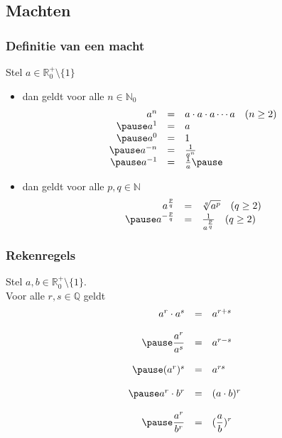 \subsection{Machten}
\begin{frame}
\frametitle{Definitie van een macht}
\pause
\begin{definitie}
Stel $a \in \mathbb{R}_0^+ \setminus \{1\}$
\begin{itemize}
\item<+-> dan geldt voor alle $n \in \mathbb{N}_0$
      \pause
      \[\begin{array}{rcl}
        a^n & = & a\cdot a\cdot a \cdots a ~~~(n\geq 2) \\ \pause
        a^1 & = & a \\ \pause
        a^0 & = & 1 \\ \pause
        a^{-n} & = & \frac{1}{a^n} \\ \pause
        a^{-1} & = & \frac{1}{a} \pause
        \end{array}\]
\item<+-> dan geldt voor alle $p,q \in \mathbb{N}$ \pause
      \[\begin{array}{rcl}
        a^{\frac{p}{q}} & = & \sqrt[q]{a^p} ~~~(q\geq 2)\\ \pause
        a^{-\frac{p}{q}} & = & \frac{1}{a^{\frac{p}{q}}} ~~~(q\geq 2)
        \end{array}\]
\end{itemize}
\end{definitie}
\end{frame}

\begin{frame}
\frametitle{Rekenregels}
\pause
\begin{eigenschap}
Stel $a,b \in \mathbb{R}_0^+\setminus\{1\}$. \\
Voor alle $r,s \in \mathbb{Q}$ geldt 
\pause
\[\begin{array}{rcl}
  a^r\cdot a^s & = & a^{r+s} \\~\\  \pause
  \displaystyle \frac{a^r}{a^s} & = & a^{r-s} \\~\\ \pause
  (a^r)^s & = & a^{rs} \\~\\ \pause
  a^r\cdot b^r & = & (a\cdot b)^r \\~\\ \pause
  \displaystyle\frac{a^r}{b^r} & = & \displaystyle(\frac{a}{b})^r
  \end{array}\]
\end{eigenschap}
\end{frame}

